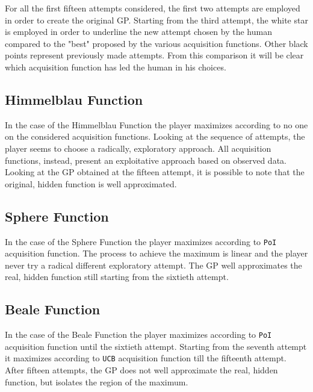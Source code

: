 For all the first fifteen attempts considered, the first two attempts are employed in order to create the original GP. Starting from the third attempt, the white star is employed in order to underline the new attempt chosen by the human compared to the "best" proposed by the various acquisition functions. Other black points represent previously made attempts. From this comparison it will be clear which acquisition function has led the human in his choices.

\subsection{Himmelblau Function}
In the case of the Himmelblau Function the player maximizes according to no one on the considered acquisition functions. Looking at the sequence of attempts, the player seems to choose a radically, exploratory approach. All acquisition functions, instead, present an exploitative approach based on observed data. Looking at the GP obtained at the fifteen attempt, it is possible to note that the original, hidden function is well approximated.

\subsection{Sphere Function}
In the case of the Sphere Function the player maximizes according to {\tt PoI} acquisition function. The process to achieve the maximum is linear and the player never try a radical different exploratory attempt. The GP well approximates the real, hidden function still starting from the sixtieth attempt.

\subsection{Beale Function}
In the case of the Beale Function the player maximizes according to {\tt PoI} acquisition function until the sixtieth attempt. Starting from the seventh attempt it maximizes according to {\tt UCB} acquisition function till the fifteenth attempt. After fifteen attempts, the GP does not well approximate the real, hidden function, but isolates the region of the maximum.


